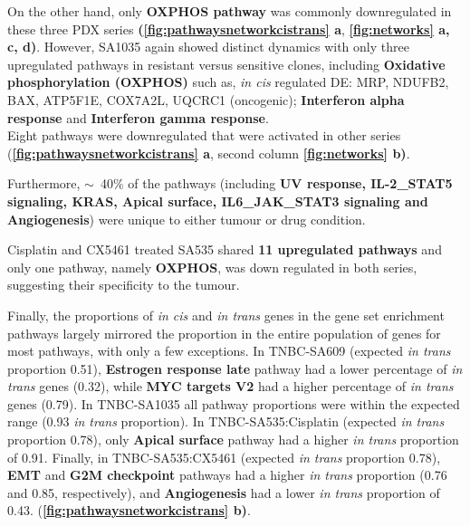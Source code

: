  On the other hand, only \textbf{OXPHOS pathway} was commonly downregulated in these three PDX series \textbf{(\autoref{fig:pathwaysnetworkcistrans} a}, \textbf{\autoref{fig:networks} a, c, d)}. However, SA1035 again showed distinct dynamics with only three upregulated pathways in resistant versus sensitive clones, including \textbf{Oxidative phosphorylation (OXPHOS)} such as, \textit{in cis} regulated DE: MRP, NDUFB2, BAX, ATP5F1E, COX7A2L, UQCRC1 (oncogenic); 
\textbf{Interferon alpha response} and \textbf{Interferon gamma response}. 
\\
Eight pathways were downregulated that were activated in other series (\textbf{\autoref{fig:pathwaysnetworkcistrans} a}, second column  \textbf{\autoref{fig:networks} b)}. 
 
Furthermore, $\sim$~40\% of the pathways (including \textbf{UV response, IL-2\_STAT5 signaling, KRAS, Apical surface, IL6\_JAK\_STAT3 signaling and Angiogenesis})  were unique to either tumour or drug condition. 

Cisplatin and CX5461 treated SA535 shared \textbf{11 upregulated pathways} and only one pathway, namely \textbf{\ac{OXPHOS}}, was down regulated in both series, suggesting their specificity to the tumour.


Finally, the proportions of \textit{in cis} and \textit{in trans} genes in the gene set enrichment pathways largely mirrored the proportion in the entire population of genes for most pathways, with only a few exceptions. In TNBC-SA609 (expected \textit{in trans} proportion 0.51), \textbf{Estrogen response late} pathway had a lower percentage of \textit{in trans} genes (0.32), while \textbf{MYC targets V2} had a higher percentage of \textit{in trans} genes (0.79). In TNBC-SA1035 all pathway proportions were within the expected range (0.93 \textit{in trans} proportion). In TNBC-SA535:Cisplatin (expected \textit{in trans} proportion 0.78), only \textbf{Apical surface} pathway had a higher \textit{in trans} proportion of 0.91. Finally, in TNBC-SA535:CX5461 (expected \textit{in trans} proportion 0.78), \textbf{EMT} and \textbf{G2M checkpoint} pathways had a higher \textit{in trans} proportion (0.76 and 0.85, respectively), and \textbf{Angiogenesis} had a lower \textit{in trans} proportion of 0.43. (\textbf{\autoref{fig:pathwaysnetworkcistrans} b)}.


